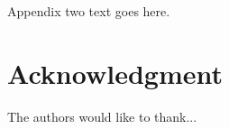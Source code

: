 \documentclass[journal]{IEEEtran}
\begin{document}
\section{}
Appendix two text goes here.


\section*{Acknowledgment}


The authors would like to thank...


\ifCLASSOPTIONcaptionsoff
  \newpage
\fi







%
%
%

% 
\end{document}
